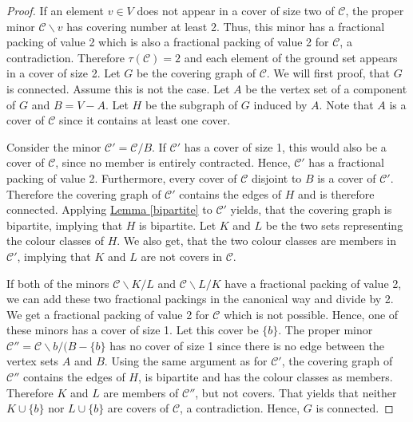 \documentclass[a4paper, 12pt, twoside=false]{scrbook}
\theoremstyle{definition}
\begin{document}
   \begin{proof}
       If an element $v \in V$ does not appear in a cover of size two of $\mathcal{C}$, the proper minor $\mathcal{C} \backslash v$ has covering number at least 2.
       Thus, this minor has a fractional packing of value 2 which is also a fractional packing of value 2 for $\mathcal{C}$, a contradiction.
       Therefore $\tau(\mathcal{C}) = 2$ and each element of the ground set appears in a cover of size 2.
       Let $G$ be the covering graph of $\mathcal{C}$.
       We will first proof, that $G$ is connected.
       Assume this is not the case.
       Let $A$ be the vertex set of a component of $G$ and $B = V - A$.
       Let $H$ be the subgraph of $G$ induced by $A$.
       Note that $A$ is a cover of $\mathcal{C}$ since it contains at least one cover.

       Consider the minor $\mathcal{C'}=\mathcal{C}/B$.
       If $\mathcal{C'}$ has a cover of size 1, this would also be a cover of $\mathcal{C}$, since no member is entirely contracted.
       Hence, $\mathcal{C'}$ has a fractional packing of value 2.
       Furthermore, every cover of $\mathcal{C}$ disjoint to $B$ is a cover of $\mathcal{C'}$.
       Therefore the covering graph of $\mathcal{C'}$ contains the edges of $H$ and is therefore connected.
       Applying \hyperref[bipartite]{Lemma \ref*{bipartite}} to $\mathcal{C'}$ yields, that the covering graph is bipartite, implying that $H$ is bipartite.
       Let $K$ and $L$ be the two sets representing the colour classes of $H$.
       We also get, that the two colour classes are members in $\mathcal{C'}$, implying that $K$ and $L$ are not covers in $\mathcal{C}$.

       If both of the minors $\mathcal{C} \backslash K / L$ and $\mathcal{C} \backslash L / K$ have a fractional packing of value 2, we can add these two fractional packings in the canonical way and divide by 2.
       We get a fractional packing of value 2 for $\mathcal{C}$ which is not possible.
       Hence, one of these minors has a cover of size 1.
       Let this cover be $\{b\}$.
       The proper minor $\mathcal{C''}=\mathcal{C} \backslash b / (B-\{b\}$ has no cover of size 1 since there is no edge between the vertex sets $A$ and $B$.
       Using the same argument as for $\mathcal{C'}$, the covering graph of $\mathcal{C''}$ contains the edges of $H$, is bipartite and has the colour classes as members.
       Therefore $K$ and $L$ are members of $\mathcal{C''}$, but not covers.
       That yields that neither $K \cup \{b\}$ nor $L \cup \{b\}$ are covers of $\mathcal{C}$, a contradiction.
       Hence, $G$ is connected.


\end{proof}
\end{document}
